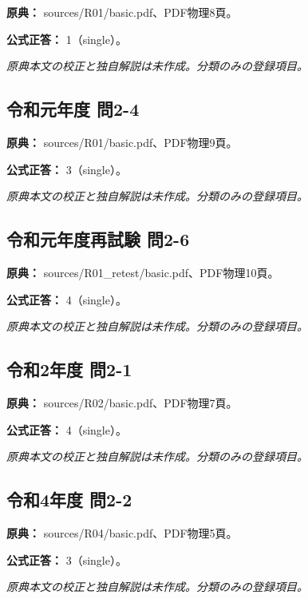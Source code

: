 \noindent\textbf{原典：} sources/R01/basic.pdf、PDF物理8頁。

\textbf{公式正答：} 1（single）。

\par\textit{原典本文の校正と独自解説は未作成。分類のみの登録項目。}

\subsection{令和元年度 問2-4}
\label{q:r01-reg-basic-2-4}

\noindent\textbf{原典：} sources/R01/basic.pdf、PDF物理9頁。

\textbf{公式正答：} 3（single）。

\par\textit{原典本文の校正と独自解説は未作成。分類のみの登録項目。}

\subsection{令和元年度再試験 問2-6}
\label{q:r01-ret-basic-2-6}

\noindent\textbf{原典：} sources/R01\_retest/basic.pdf、PDF物理10頁。

\textbf{公式正答：} 4（single）。

\par\textit{原典本文の校正と独自解説は未作成。分類のみの登録項目。}

\subsection{令和2年度 問2-1}
\label{q:r02-reg-basic-2-1}

\noindent\textbf{原典：} sources/R02/basic.pdf、PDF物理7頁。

\textbf{公式正答：} 4（single）。

\par\textit{原典本文の校正と独自解説は未作成。分類のみの登録項目。}

\subsection{令和4年度 問2-2}
\label{q:r04-reg-basic-2-2}

\noindent\textbf{原典：} sources/R04/basic.pdf、PDF物理5頁。

\textbf{公式正答：} 3（single）。

\par\textit{原典本文の校正と独自解説は未作成。分類のみの登録項目。}

